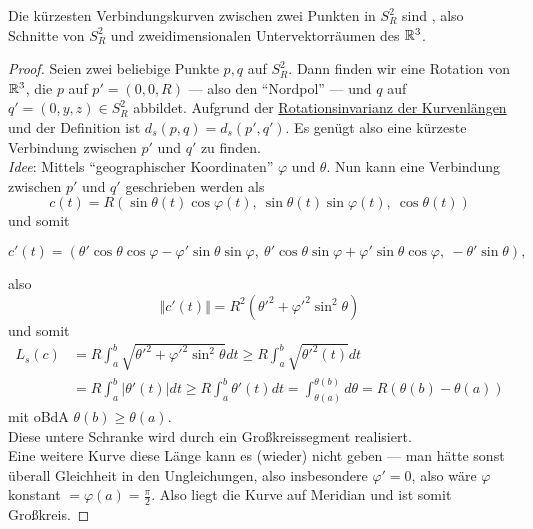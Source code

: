 \begin{lemma}
  Die kürzesten Verbindungskurven zwischen zwei Punkten in $ S^2_R $ sind , also Schnitte von $ S^2_R $ und zweidimensionalen Untervektorräumen des $ \mathbb{R}^3 $.
  \begin{proof}
    Seien zwei beliebige Punkte $ p,q $ auf $ S^2_R $. Dann finden wir eine Rotation von $ \mathbb{R}^3 $, die $ p $ auf $ p' = (0,0,R) $ --- also den ``Nordpol'' --- und $ q $ auf $ q' = (0,y,z) \in S^2_R $ abbildet. Aufgrund der \hyperref[lemma:kurvenlaengen]{Rotationsinvarianz der Kurvenlängen} und der Definition ist $ d_s(p,q) = d_s(p', q') $. Es genügt also eine kürzeste Verbindung zwischen $ p' $ und $ q' $ zu finden. \\
    \emph{Idee}: Mittels ``geographischer Koordinaten'' $ \varphi $ und $ \theta $. Nun kann eine Verbindung zwischen $ p' $ und $ q' $ geschrieben werden als
    \begin{equation*}
      c(t) = R(\sin\theta(t)\cos\varphi(t), \ \sin\theta(t)\sin\varphi(t), \ \cos\theta(t))
    \end{equation*}
    und somit
    \begin{small}
      \begin{equation*}
        c'(t) = (\theta'\cos\theta\cos\varphi-\varphi'\sin\theta\sin\varphi, \ \theta'\cos\theta\sin\varphi+\varphi'\sin\theta\cos\varphi, \ -\theta'\sin\theta)\text{,}
      \end{equation*}
    \end{small}
    also
    \begin{equation*}
      \Vert c'(t) \Vert = R^2({\theta'}^2 + {\varphi'}^2\sin^2\theta)
    \end{equation*}
    und somit
    \begin{align*}
      L_s(c) &= R\int_a^b\sqrt{{\theta'}^2+{\varphi'}^2\sin^2\theta}dt \geq R\int_a^b\sqrt{{\theta'}^2(t)}dt \\
      &= R\int_a^b \vert \theta'(t) \vert dt \geq R\int_a^b \theta'(t)dt = \int_{\theta(a)}^{\theta(b)}d\theta = R(\theta(b)-\theta(a))
    \end{align*}
    mit oBdA $ \theta(b) \geq \theta(a) $. \\
    Diese untere Schranke wird durch ein Großkreissegment realisiert. \\
    Eine weitere Kurve diese Länge kann es (wieder) nicht geben --- man hätte sonst überall Gleichheit in den Ungleichungen, also insbesondere $ \varphi' = 0 $, also wäre $ \varphi $ konstant $ = \varphi(a) = \frac{\pi}{2} $. Also liegt die Kurve auf Meridian und ist somit Großkreis.
  \end{proof}
\end{lemma}

